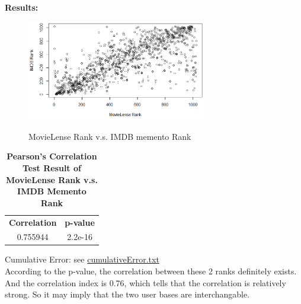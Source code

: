 \documentclass{article}
\begin{document}
		\noindent\\\textbf{Results:}
		\begin{figure}[!htb]
			\centering 
			\href{https://github.com/zhangboroy/cs532-s17/blob/master/assg07_submission/Q6.png}
			{\includegraphics[width=0.7\textwidth]{Q6.png}}
			\label{fig:MovieLense Rank v.s. IMDB memento Rank}
			\caption{MovieLense Rank v.s. IMDB memento Rank}
		\end{figure}
		\begin{table}[!htb]
			\centering
			\caption{\textbf{Pearson's Correlation Test Result of MovieLense Rank v.s. IMDB Memento Rank}}
			\begin{tabular}{cc}
				\toprule
				\textbf{Correlation} & \textbf{p-value}\\
				0.755944 & 2.2e-16\\
				\bottomrule
			\end{tabular}
		\end{table}

		Cumulative Error: see \href{https://github.com/zhangboroy/cs532-s17/blob/master/assg07_submission/cumulativeError.txt}{cumulativeError.txt}\\

		According to the p-value, the correlation between these 2 ranks definitely exists. And the correlation index is 0.76, which tells that the correlation is relatively strong. So it may imply that the two user bases are interchangable.\\
	
\end{document}
